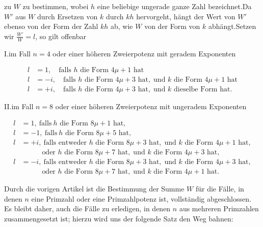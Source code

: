 zu $W$ zu bestimmen, wobei $h$ eine beliebige ungerade ganze Zahl bezeichnet.\quad Da $W'$ aus $W$ durch Ersetzen von $k$ durch $kh$ hervorgeht, hängt der Wert von $W'$ ebenso von der Form der Zahl $kh$ ab, wie $W$ von der Form von $k$ abhängt.\quad Setzen wir $\frac{W'}{W}=l$, so gilt offenbar

I.\quad im Fall $n=4$ oder einer höheren Zweierpotenz mit geradem Exponenten

\[
\begin{aligned}
l&=1,\quad\text{falls }h\text{ die Form }4\mu+1\text{ hat}\\
l&=-i,\quad\text{falls }h\text{ die Form }4\mu+3\text{ hat},\;\text{und }k\text{ die Form }4\mu+1\text{ hat}\\
l&=+i,\quad\text{falls }h\text{ die Form }4\mu+3\text{ hat},\;\text{und }k\text{ dieselbe Form hat.}
\end{aligned}
\]


II.\quad im Fall $n=8$ oder einer höheren Zweierpotenz mit ungeradem Exponenten

\[
\begin{aligned}
l&=1,\ \text{falls}\  h\text{ die Form }8\mu+1\text{ hat},\\
l&=-1,\ \text{falls}\  h\text{ die Form }8\mu+5\text{ hat},\\
l&=+i,\ \text{falls entweder }h\text{ die Form }8\mu+3\text{ hat},\;\text{und }k\text{ die Form }4\mu+1\text{ hat},\\
&\phantom{=+i,}\text{oder }h\text{ die Form }8\mu+7\text{ hat},\;\text{und }k\text{ die Form }4\mu+3\text{ hat},\\
l&=-i,\ \text{falls entweder }h\text{ die Form }8\mu+3\text{ hat},\;\text{und }k\text{ die Form }4\mu+3\text{ hat},\\
&\phantom{=+i,}\text{oder }h\text{ die Form }8\mu+7\text{ hat},\;\text{und }k\text{ die Form }4\mu+1\text{ hat}.
\end{aligned}
\]

Durch die vorigen Artikel ist die Bestimmung der Summe $W$ für die Fälle, in denen $n$ eine Primzahl oder eine Primzahlpotenz ist, vollständig abgeschlossen. Es bleibt daher, auch die Fälle zu erledigen, in denen $n$ aus mehreren Primzahlen zusammengesetzt ist; hierzu wird uns der folgende Satz den Weg bahnen:
